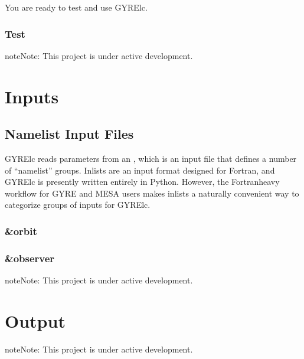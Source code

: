 \documentclass[letterpaper,10pt,english]{sphinxmanual}
\begin{document}
\sphinxAtStartPar
You are ready to test and use GYRE\sphinxhyphen{}lc.


\subsection{Test}
\label{\detokenize{ref-guide/installation:test}}
\begin{sphinxadmonition}{note}{Note:}
\sphinxAtStartPar
This project is under active development.
\end{sphinxadmonition}


\chapter{Inputs}
\label{\detokenize{ref-guide/inputs:inputs}}\label{\detokenize{ref-guide/inputs::doc}}

\section{Namelist Input Files}
\label{\detokenize{ref-guide/inputs:namelist-input-files}}
\sphinxAtStartPar
GYRE\sphinxhyphen{}lc reads parameters from an , which is an input file that defines a number of “namelist” groups. Inlists are an input format designed for Fortran, and GYRE\sphinxhyphen{}lc is presently written entirely in Python. However, the Fortran\sphinxhyphen{}heavy workflow for GYRE and MESA users makes inlists a naturally convenient way to categorize groups of inputs for GYRE\sphinxhyphen{}lc.


\subsection{\&orbit}
\label{\detokenize{ref-guide/inputs:orbit}}

\subsection{\&observer}
\label{\detokenize{ref-guide/inputs:observer}}
\begin{sphinxadmonition}{note}{Note:}
\sphinxAtStartPar
This project is under active development.
\end{sphinxadmonition}


\chapter{Output}
\label{\detokenize{ref-guide/output:output}}\label{\detokenize{ref-guide/output::doc}}
\begin{sphinxadmonition}{note}{Note:}
\sphinxAtStartPar
This project is under active development.
\end{sphinxadmonition}
\end{document}

